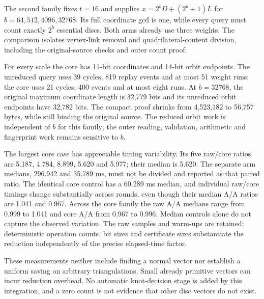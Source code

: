 The second family fixes $t=16$ and supplies
$x=2^bD+(2^b+1)L$ for $b=64,512,4096,32768$. Its full coordinate gcd is one,
while every query must count exactly $2^b$ essential discs. Both arms already
use three weights. The comparison isolates vertex-link removal and
quadrilateral-content division, including the original-source checks and
outer count proof.



For every scale the core has 11-bit coordinates and 14-bit orbit endpoints.
The unreduced query uses 39 cycles, 819 replay events and at most 51 weight
runs; the core uses 21 cycles, 400 events and at most eight runs. At
$b=32768$, the original maximum coordinate length is 32,779 bits and its
unreduced orbit endpoints have 32,782 bits. The compact proof shrinks from
4,523,182 to 56,757 bytes, while still binding the original source. The
reduced orbit work is independent of $b$ for this family; the outer reading,
validation, arithmetic and fingerprint work remains sensitive to $b$.

The largest core case has appreciable timing variability. Its five raw/core
ratios are 5.187, 4.784, 8.899, 5.620 and 5.977; their median is 5.620.
The separate arm medians, 296.942 and 35.789 ms, must not be divided and
reported as that paired ratio. The identical core control has a 60.289 ms
median, and individual raw/core timings change substantially across rounds,
even though their median A/A ratios are 1.041 and 0.967. Across the core
family the raw A/A medians range from 0.999 to 1.041 and core A/A from
0.967 to 0.996. Median controls alone do not capture the observed variation.
The raw samples and warm-ups are retained; deterministic operation counts,
bit sizes and certificate sizes substantiate the reduction independently of
the precise elapsed-time factor.

These measurements neither include finding a normal vector nor establish a
uniform saving on arbitrary triangulations. Small already primitive vectors
can incur reduction overhead. No automatic knot-decision stage is added by
this integration, and a zero count is not evidence that other disc vectors
do not exist.
